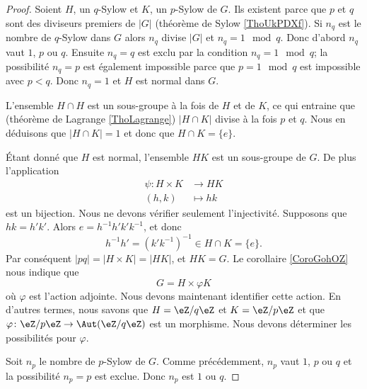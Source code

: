\begin{proof}
    Soient \( H\), un \( q\)-Sylow et \( K\), un \( p\)-Sylow de \( G\). Ils existent parce que \( p\) et \( q\) sont des diviseurs premiers de \( | G |\) (théorème de Sylow \ref{ThoUkPDXf}). Si \( n_q\) est le nombre de \( q\)-Sylow dans \( G\) alors \( n_q\) divise \( | G |\) et \( n_q=1\mod q\). Donc d'abord \( n_q\) vaut \( 1\), \( p\) ou \( q\). Ensuite \( n_q=q\) est exclu par la condition \( n_q=1\mod q\); la possibilité \( n_q=p\) est également impossible parce que \( p=1\mod q\) est impossible avec \( p<q\). Donc \( n_q=1\) et \( H\) est normal dans \( G\).

    L'ensemble \( H\cap H\) est un sous-groupe à la fois de \( H\) et de \( K\), ce qui entraine que (théorème de Lagrange \ref{ThoLagrange}) \( | H\cap K |\) divise à la fois \( p\) et \( q\). Nous en déduisons que \( | H\cap K |=1\) et donc que \( H\cap K=\{ e \}\).

    Étant donné que \( H\) est normal, l'ensemble \( HK\) est un sous-groupe de \( G\). De plus l'application
    \begin{equation}
        \begin{aligned}
            \psi\colon H\times K&\to HK \\
            (h,k)&\mapsto hk 
        \end{aligned}
    \end{equation}
    est un bijection. Nous ne devons vérifier seulement l'injectivité. Supposons que \( hk=h'k'\). Alors \( e=h^{-1}h'k'k^{-1}\), et donc
    \begin{equation}
        h^{-1} h'=(k'k^{-1})^{-1}\in H\cap K=\{ e \}.
    \end{equation}
    Par conséquent \( | pq |=| H\times K |=| HK |\), et \( HK=G\). Le corollaire \ref{CoroGohOZ} nous indique que
    \begin{equation}    \label{EqGjQjFN}
        G=H\times{\varphi}K
    \end{equation}
    où \( \varphi\) est l'action adjointe. Nous devons maintenant identifier cette action. En d'autres termes, nous savons que \( H=\eZ/q\eZ\) et \( K=\eZ/p\eZ\) et que \( \varphi\colon \eZ/p\eZ\to \Aut(\eZ/q\eZ)\) est un morphisme. Nous devons déterminer les possibilités pour \( \varphi\).

    Soit \( n_p\) le nombre de \( p\)-Sylow de \( G\). Comme précédemment, \( n_p\) vaut \( 1\), \( p\) ou \( q\) et la possibilité \( n_p=p\) est exclue. Donc \( n_p\) est \( 1\) ou \( q\).


\end{proof}
